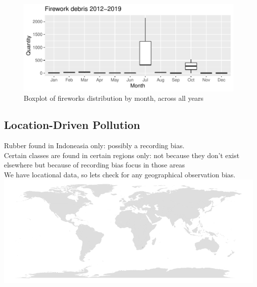 \documentclass[10pt]{article}\usepackage[]{graphicx}\usepackage[]{color}
\newenvironment{knitrout}{}{} %
\begin{document}
\begin{figure}[H] %
\begin{center}
\begin{knitrout}\small
{}\color{fgcolor}
\includegraphics[width=1\linewidth]{figure/unnamed-chunk-15-1} 

\end{knitrout}

\caption {Boxplot of fireworks distribution by month, across all years}
\label{figA}
\end {center}
\end {figure}





\subsection{Location-Driven Pollution}

Rubber found in Indoneasia only: possibly a recording bias.\\

Certain classes are found in certain regions only: not because they don't exist elsewhere but because of recording bias focus in those areas\\

We have locational data, so lets check for any geographical observation bias.
\begin{knitrout}\small
{}\color{fgcolor}
\includegraphics[width=1\linewidth]{figure/unnamed-chunk-16-1} 

\end{knitrout}
\end{document}
